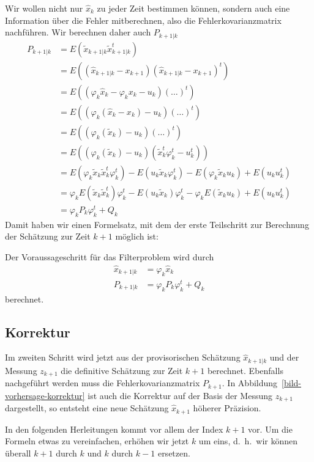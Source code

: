 Wir wollen nicht nur $\hat x_k$ zu jeder Zeit bestimmen können, sondern
auch eine Information über die Fehler mitberechnen, also die Fehlerkovarianzmatrix
nachführen.
Wir berechnen daher auch $P_{k+1|k}$
\begin{align*}
P_{k+1|k}&=E(\tilde x_{k+1|k}\tilde x_{k+1|k}^t)\\
&=E( (\hat x_{k+1|k}-x_{k+1} ) (\hat x_{k+1|k}-x_{k+1} )^t)\\
&=E(
(\varphi_k\hat x_k-\varphi_kx_k-u_k)
(\dots)^t
)\\
&=E(
(\varphi_k(\hat x_k-x_k)-u_k)
(\dots)^t
)\\
&=E(
(\varphi_k(\tilde x_k)-u_k)
(\dots)^t
)\\
&=E(
(\varphi_k(\tilde x_k)-u_k)
(\tilde x_k^t\varphi_k^t-u_k^t)
)\\
&=E(\varphi_k\tilde x_k \tilde x_k^t\varphi_k^t)-E(u_k\tilde x_k\varphi_k^t)-E(\varphi_k\tilde x_ku_k)+E(u_ku_k^t)\\
&=\varphi_k E(\tilde x_k \tilde x_k^t)\varphi_k^t-E(u_k\tilde x_k)\varphi_k^t-\varphi_k E(\tilde x_ku_k)+E(u_ku_k^t)\\
&=\varphi_kP_k\varphi_k^t+Q_k
\end{align*}
Damit haben wir einen Formelsatz, mit dem der erste Teilschritt zur Berechnung
der Schätzung zur Zeit $k+1$ möglich ist:
\begin{definition}Der Voraussageschritt für das Filterproblem wird durch
\begin{align}
\hat x_{k+1|k}&=\varphi_k\hat x_k \label{estimate-prediction}\\
P_{k+1|k}&=\varphi_kP_k\varphi_k^t + Q_k \label{covariance-prediction}
\end{align}
berechnet.
\end{definition}

\subsection{Korrektur}
Im zweiten Schritt wird jetzt aus der provisorischen Schätzung $\hat x_{k+1|k}$
und der Messung $z_{k+1}$ die definitive Schätzung zur Zeit $k+1$ berechnet.
Ebenfalls nachgeführt werden muss die Fehlerkovarianzmatrix $P_{k+1}$.
In Abbildung~\ref{bild-vorhersage-korrektur} ist auch die Korrektur auf der Basis
der Messung $z_{k+1}$ dargestellt, so entsteht eine neue Schätzung
$\hat x_{k+1}$ höherer Präzision.

In den folgenden Herleitungen kommt vor allem der Index $k+1$ vor.
Um die Formeln
etwas zu vereinfachen, erhöhen wir jetzt $k$ um eins, d.~h.~wir können
überall $k+1$ durch $k$ und $k$ durch $k-1$ ersetzen.

